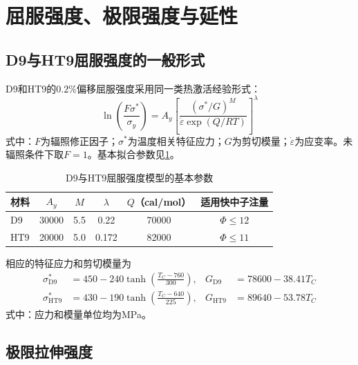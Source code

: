 \section{屈服强度、极限强度与延性}
\label{app:cladding_strength_models}

\subsection{D9与HT9屈服强度的一般形式}

D9和HT9的$0.2\%$偏移屈服强度采用同一类热激活经验形式\cite{hofmanMetallicFuelsHandbook2019}：
\begin{equation}
	\ln\!\left(\frac{F\sigma^*}{\sigma_y}\right)
	=A_y\left[
	\frac{(\sigma^*/G)^M}
	{\dot\varepsilon\exp(Q/RT)}
	\right]^\lambda
	\label{eq:appendix_cladding_yield_strength_general}
\end{equation}
式中：$F$为辐照修正因子；$\sigma^*$为温度相关特征应力；$G$为剪切模量；$\dot\varepsilon$为应变率。未辐照条件下取$F=1$。基本拟合参数见\tablename\ref{tab:appendix_cladding_yield_parameters}。

\begin{table}[htbp]
	\centering
	\caption{D9与HT9屈服强度模型的基本参数}
	\label{tab:appendix_cladding_yield_parameters}
	\begin{tabular*}{\textwidth}{
			@{\extracolsep{\fill}}
			lccccc
			@{}
		}
		\toprule
		材料 & $A_y$ & $M$ & $\lambda$ & $Q$（cal/mol） & 适用快中子注量 \\
		\midrule
		D9  & 30000 & 5.5 & 0.22  & 70000 & $\Phi\leq12$ \\
		HT9 & 20000 & 5.0 & 0.172 & 82000 & $\Phi\leq11$ \\
		\bottomrule
	\end{tabular*}
\end{table}

相应的特征应力和剪切模量为
\begin{equation}
	\label{eq:appendix_cladding_characteristic_stress}
	\begin{aligned}
		\sigma^*_{\mathrm{D9}}
		&=450-240\tanh\!\left(\frac{T_C-760}{300}\right),
		&
		G_{\mathrm{D9}}&=78600-38.41T_C\\
		\sigma^*_{\mathrm{HT9}}
		&=430-190\tanh\!\left(\frac{T_C-640}{225}\right),
		&
		G_{\mathrm{HT9}}&=89640-53.78T_C
	\end{aligned}
\end{equation}
式中：应力和模量单位均为MPa。

\subsection{极限拉伸强度}

